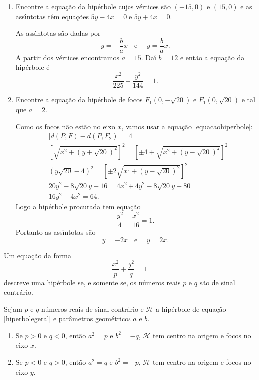 \begin{exemplos}
  \begin{enumerate}
    \item Encontre a equa\c{c}\~ao da hip\'erbole cujos v\'ertices s\~ao $(-15,0)$ e $(15,0)$ e as ass{\'\i}ntotas t\^em equa\c{c}\~oes $5y - 4x = 0$ e $5y + 4x = 0$.
    \begin{solucao}
      As ass{\'\i}ntotas s\~ao dadas por
      \[
        y = -\dfrac{b}{a}x \quad\mbox{e }\quad y = \dfrac{b}{a}x.
      \]
      A partir dos v\'ertices encontramos $a = 15$. Da{\'\i} $b = 12$ e ent\~ao a equa\c{c}\~ao da hip\'erbole \'e
      \[
        \dfrac{x^2}{225} - \dfrac{y^2}{144} = 1.
      \]
    \end{solucao}
    \item Encontre a equa\c{c}\~ao da hip\'erbole de focos $F_1(0,-\sqrt{20})$ e $F_1(0,\sqrt{20})$ e tal que $a = 2$.
    \begin{solucao}
      Como os focos n\~ao est\~ao no eixo $x$, vamos usar a equa\c{c}\~ao \eqref{equacaohiperbole}:
      \begin{align*}
        &\mid d(P,F) - d(P,F_2)\mid = 4\\
        &\left[\sqrt{x^2 + (y + \sqrt{20})^2}\right]^2 = \left[\pm 4 + \sqrt{x^2 + (y - \sqrt{20})^2}\right]^2\\
        &(y\sqrt{20} - 4)^2 = \left[\pm 2\sqrt{x^2 + (y - \sqrt{20})^2}\right]^2\\
        &20y^2 - 8\sqrt{20}y + 16 = 4x^2 + 4y^2 - 8\sqrt{20}y + 80\\
        &16y^2 - 4x^2 = 64.
      \end{align*}
      Logo a hip\'erbole procurada tem equa\c{c}\~ao
      \[
        \dfrac{y^2}{4} - \dfrac{x^2}{16} = 1.
      \]
      Portanto as ass{\'\i}ntotas s\~ao
      \[
        y = -2x \quad\mbox{e }\quad y = 2x.
      \]
    \end{solucao}
  \end{enumerate}
\end{exemplos}

\begin{proposicao}
  Um equa\c{c}\~ao da forma
  \begin{equation}\label{hiperbolegeral}
    \dfrac{x^2}{p} + \dfrac{y^2}{q} = 1
  \end{equation}
  descreve uma hip\'erbole se, e somente se, os n\'umeros reais $p$ e $q$ s\~ao de sinal contr\'ario.
\end{proposicao}

\begin{corolario}
  Sejam $p$ e $q$ n\'umeros reais de sinal contr\'ario e $\mathcal{H}$ a hip\'erbole de equa\c{c}\~ao \eqref{hiperbolegeral} e par\^ametros geom\'etricos $a$ e $b$.
  \begin{enumerate}
    \item Se $p > 0$ e $q < 0$, ent\~ao $a^2 = p$ e $b^2 = -q$, $\mathcal{H}$ tem centro na origem e focos no eixo $x$.
    \item Se $p < 0$ e $q > 0$, ent\~ao $a^2 = q$ e $b^2 = -p$, $\mathcal{H}$ tem centro na origem e focos no eixo $y$.
  \end{enumerate}
\end{corolario}

